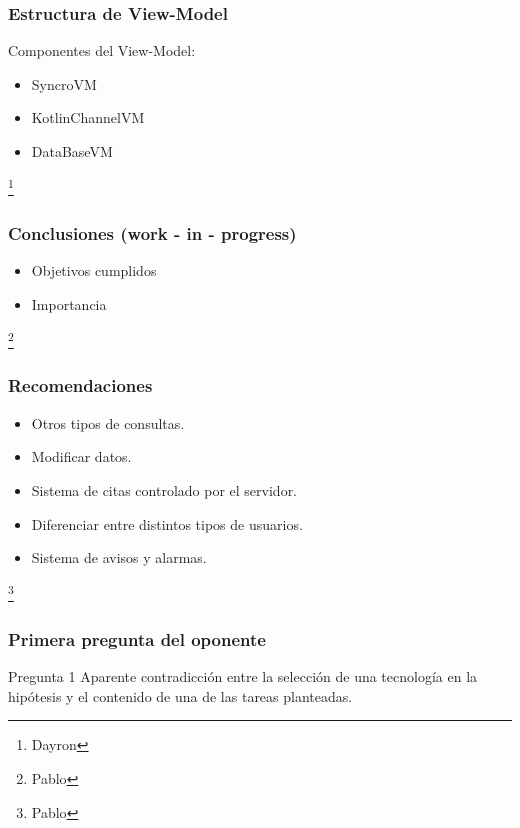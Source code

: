 \documentclass[14pt]{beamer}
\begin{document}
\begin{frame}
\frametitle{Estructura de View-Model}
Componentes del View-Model:
\begin{itemize}
\item SyncroVM
\item KotlinChannelVM
\item DataBaseVM


\end{itemize}



\footnote{Dayron}
\end{frame}

\begin{frame}
\frametitle{Conclusiones (work - in - progress)}
\begin{itemize}
\item Objetivos cumplidos

\item Importancia
\end{itemize}
\footnote{Pablo}
\end{frame}


\begin{frame}
\frametitle{Recomendaciones}

\begin{itemize}
\item Otros tipos de consultas.
\item Modificar datos.
\item Sistema de citas controlado por el servidor.
\item Diferenciar entre distintos tipos de usuarios.
\item Sistema de avisos y alarmas.
\end{itemize}

\footnote{Pablo}
\end{frame}





\begin{frame}
\maketitle
\end{frame}




\begin{frame}
\frametitle{Primera pregunta del oponente}
\begin{block}{Pregunta 1}
Aparente contradicción entre la selección de una tecnología en la hipótesis y el contenido de una de las tareas planteadas.
\end{block}
\end{frame}
\end{document}
